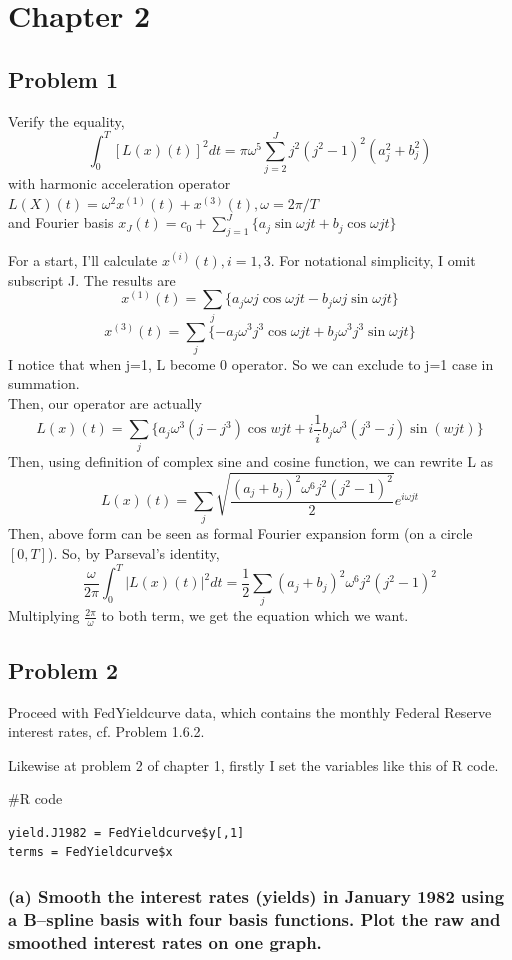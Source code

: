 \documentclass{article}
\newenvironment{Rcode}%
{%
    \begin{mdframed}
    \#R code
    \begin{small}
}
{%
    \end{small}
    \end{mdframed}
}
\begin{document}
\newpage
\section{Chapter 2}
\subsection{Problem 1}
Verify the equality,
\[\int_{0}^{T}[L(x)(t)]^2dt=\pi\omega^5\sum_{j=2}^{J}j^2(j^2-1)^2(a_j^2+b_j^2)\]
with harmonic acceleration operator \(L(X)(t)=\omega^2x^{(1)}(t)+x^{(3)}(t), \omega=2\pi/T\) \\
and Fourier basis \(x_{J}(t)=c_0+\sum_{j=1}^{J}\{a_j\sin{\omega jt}+b_j\cos{\omega jt}\}\)

For a start, I'll calculate $x^{(i)}(t), i=1,3$. For notational simplicity, I omit subscript J. The results are
\[x^{(1)}(t) = \sum_{j} \{a_j\omega j \cos{\omega jt} - b_j\omega j \sin{\omega jt}\}\]
\[x^{(3)}(t) = \sum_{j} \{-a_j\omega^3 j^3 \cos{\omega jt} + b_j\omega^3 j^3 \sin{\omega jt}\}\]
I notice that when j=1, L become 0 operator. So we can exclude to j=1 case in summation. \\
Then, our operator are actually
\[L(x)(t)=\sum_{j}\{a_j\omega^3(j-j^3)\cos{wjt} + i\frac{1}{i}b_j\omega^3(j^3-j)\sin(wjt)\}\]
Then, using definition of complex sine and cosine function, we can rewrite L as
\[L(x)(t)=\sum_{j}\sqrt{\frac{(a_j+b_j)^2\omega^6j^2(j^2-1)^2}{2}}e^{i\omega jt}\]
Then, above form can be seen as formal Fourier expansion form (on a circle $[0,T]$). So, by Parseval's identity,
\[\frac{\omega}{2\pi} \int_{0}^{T}|L(x)(t)|^2dt = \frac{1}{2}\sum_{j}(a_j+b_j)^2\omega^6j^2(j^2-1)^2\]
Multiplying $\frac{2\pi}{\omega}$ to both term, we get the equation which we want.


\newpage
\subsection{Problem 2}
Proceed with FedYieldcurve data, which contains the monthly Federal Reserve interest rates, cf. Problem 1.6.2.

Likewise at problem 2 of chapter 1, firstly I set the variables like this of R code.
\begin{Rcode}
    \begin{verbatim}
yield.J1982 = FedYieldcurve$y[,1]
terms = FedYieldcurve$x
    \end{verbatim}
\end{Rcode}


\subsubsection*{(a) Smooth the interest rates (yields) in January 1982 using a B–spline basis 
with four basis functions. Plot the raw and smoothed interest rates on one graph.}
\end{document}
